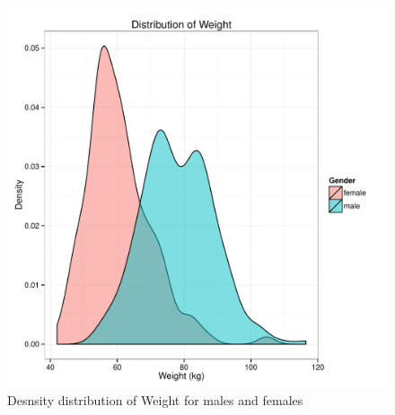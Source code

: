 \documentclass[11pt]{article}\usepackage[]{graphicx}\usepackage[]{color}
\makeatletter
\def\maxwidth{ %
  \ifdim\Gin@nat@width>\linewidth
    \linewidth
  \else
    \Gin@nat@width
  \fi
}
\newenvironment{knitrout}{}{} %
\makeatother
\begin{document}
\begin{figure}
\begin{center}
\begin{knitrout}
\color{fgcolor}
\includegraphics[width=\maxwidth]{figure/wdt} 

\end{knitrout}

\end{center}
\vspace{-20pt}
\caption{Desnsity distribution of Weight for males and females}
\label{fig:one}
\end{figure}
\end{document}
